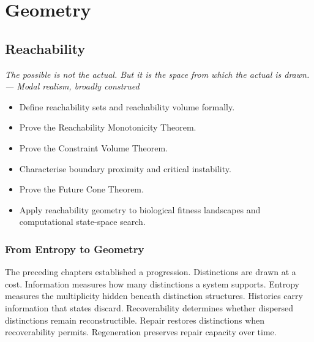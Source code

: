 \documentclass[12pt,twoside,openright]{book}
\newenvironment{epigraph}[2]{%
  \vspace{1em}\begin{flushright}
  \begin{minipage}{0.72\textwidth}
  \itshape\small #1\\[0.4em]
  \upshape\footnotesize\sffamily\color{DistGray}--- #2
  \end{minipage}\end{flushright}\vspace{1.5em}}{}
\newenvironment{objectives}{%
  \begin{tcolorbox}[colback=DistBlue!5,colframe=DistBlue,
    title={\faCheckCircle\enspace Learning Objectives},
    fonttitle=\sffamily\bfseries\color{white},
    attach boxed title to top left={yshift=-2mm,xshift=4mm},
    boxed title style={colback=DistBlue},breakable]
  \begin{itemize}[leftmargin=*,nosep]}{%
  \end{itemize}\end{tcolorbox}\vspace{1em}}
\begin{document}
\part{Geometry}

\chapter{Reachability}
\label{ch:reachability}

\begin{epigraph}{The possible is not the actual. But it is
  the space from which the actual is drawn.}%
  {Modal realism, broadly construed}
\end{epigraph}

\begin{objectives}
  \item Define reachability sets and reachability volume
        formally.
  \item Prove the Reachability Monotonicity Theorem.
  \item Prove the Constraint Volume Theorem.
  \item Characterise boundary proximity and critical
        instability.
  \item Prove the Future Cone Theorem.
  \item Apply reachability geometry to biological fitness
        landscapes and computational state-space search.
\end{objectives}

\section{From Entropy to Geometry}
\label{sec:ch13-motivation}

The preceding chapters established a progression.
Distinctions are drawn at a cost. Information measures how
many distinctions a system supports. Entropy measures the
multiplicity hidden beneath distinction structures.
Histories carry information that states discard.
Recoverability determines whether dispersed distinctions
remain reconstructible. Repair restores distinctions when
recoverability permits. Regeneration preserves repair
capacity over time.
\end{document}
